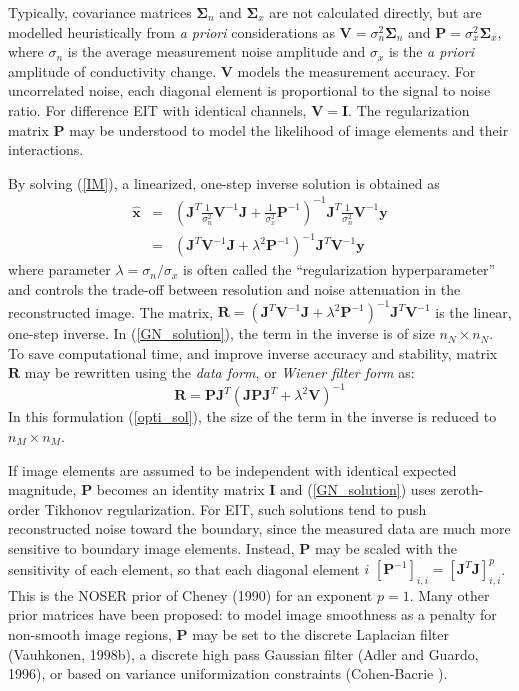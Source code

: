 \documentclass[12pt]{iopart}
\newcommand{\xH}{\mbox{$\mathbf{\hat x}$}}
\newcommand{\yB}{\mbox{$\mathbf{y}$}}
\newcommand{\RB}{\mbox{$\mathbf{R}$}}
\newcommand{\IB}{\mbox{$\mathbf{I}$}}
\newcommand{\JB}{\mbox{$\mathbf{J}$}}
\renewcommand{\PB}{\mbox{$\mathbf{P}$}}
\newcommand{\VB}{\mbox{$\mathbf{V}$}}
\newcommand{\SG}{\mbox{${\boldsymbol \Sigma}$}}
\begin{document}
Typically,  covariance matrices
$\SG_n$ and $\SG_x$ are not calculated directly, but
are modelled heuristically from {\em a priori}
considerations as 
 $\VB = \sigma_n^{2}\SG_n$
 and
 $\PB = \sigma_x^{2}\SG_x$,
where $\sigma_n$ is the average measurement noise amplitude and
$\sigma_x$ is the {\em a priori} amplitude of conductivity change.
$\VB$ models the measurement accuracy. For uncorrelated noise,
each diagonal element is proportional to the signal to noise
ratio. For difference EIT with identical channels, $\VB=\IB$. The
regularization matrix $\PB$ may be understood to model the
likelihood of image elements and their interactions.

By solving (\ref{IM}), a linearized, one-step inverse solution is
obtained as
\begin{eqnarray}\label{GN_solution}
\xH&=&\left(
    \JB^T \frac{1}{\sigma_n^2} \VB^{-1} \JB 
     +
    \frac{1}{\sigma_x^2} \PB^{-1}
    \right)^{-1}
    \JB^T \frac{1}{\sigma_n^2}\VB^{-1}\yB
\nonumber \\
   &=&\left(
    \JB^T \VB^{-1} \JB + \lambda^2 \PB^{-1}
    \right)^{-1}
    \JB^T \VB^{-1} \yB
\end{eqnarray}
where parameter  $\lambda=\sigma_n/\sigma_x$ is
often called the ``regularization hyperparameter'' and
controls the trade-off
between resolution and noise attenuation in the reconstructed
image.
The matrix,
$\RB=\left(\JB^T\VB^{-1}\JB+\lambda^2\PB^{-1}\right)^{-1}\JB^T\VB^{-1}$
is the linear, one-step inverse.
In (\ref{GN_solution}), the term in the inverse is of size
$n_N\times n_N$. To save computational time, and improve inverse
accuracy and stability, matrix $\RB$ may be rewritten 
using the {\em data form}, or {\em Wiener filter form} as:
\begin{equation}\label{opti_sol}
 \RB =\PB\JB^T
    \left(
       \JB\PB\JB^T+\lambda^2\VB
   \right)^{-1}
\end{equation}
In this formulation (\ref{opti_sol}), the size of the term in the
inverse is reduced to $n_M\times n_M$.

If image elements are assumed to be independent with identical
expected magnitude, $\PB$ becomes an identity matrix $\IB$ and
(\ref{GN_solution}) uses zeroth-order Tikhonov regularization. For
EIT, such solutions tend to push reconstructed noise toward the
boundary, since the measured data are much more sensitive to
boundary image elements. Instead, $\PB$ may be scaled with the
sensitivity of each element, so that each diagonal element $i$ 
$[\PB^{-1}]_{i,i} = \left[ \JB^T \JB
\right]_{i,i}^p$. This is the NOSER prior of Cheney \etal (1990)
for an exponent $p=1$. Many other prior matrices have been
proposed: to model image smoothness as a penalty for non-smooth
image regions, $\PB$ may be set to the discrete Laplacian filter
(Vauhkonen, 1998b), a discrete high pass Gaussian filter (Adler
and Guardo, 1996), or based on variance uniformization
constraints (Cohen-Bacrie ).
\end{document}
